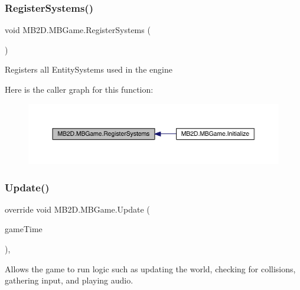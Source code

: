 \subsubsection{\texorpdfstring{Register\+Systems()}{RegisterSystems()}}
{\footnotesize\ttfamily void M\+B2\+D.\+M\+B\+Game.\+Register\+Systems (\begin{DoxyParamCaption}{ }\end{DoxyParamCaption})\hspace{0.3cm}{\ttfamily [inline]}}



Registers all Entity\+Systems used in the engine 

Here is the caller graph for this function\+:
\nopagebreak
\begin{figure}[H]
\begin{center}
\leavevmode
\includegraphics[width=350pt]{class_m_b2_d_1_1_m_b_game_ad7e9a60dbaefe1416db0456b07b13487_icgraph}
\end{center}
\end{figure}
\hypertarget{class_m_b2_d_1_1_m_b_game_a82968a66f75f9c437074ce7bfd468455}{}\label{class_m_b2_d_1_1_m_b_game_a82968a66f75f9c437074ce7bfd468455} 
\subsubsection{\texorpdfstring{Update()}{Update()}}
{\footnotesize\ttfamily override void M\+B2\+D.\+M\+B\+Game.\+Update (\begin{DoxyParamCaption}\item[{Game\+Time}]{game\+Time }\end{DoxyParamCaption})\hspace{0.3cm}{\ttfamily [inline]}, {\ttfamily [protected]}}



Allows the game to run logic such as updating the world, checking for collisions, gathering input, and playing audio. 


